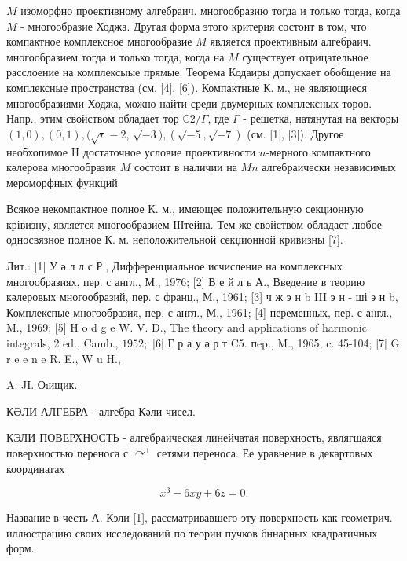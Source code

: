\documentclass[10pt]{article}
\begin{document}
$M$ изоморфно проективному алгебраич. многообразию тогда и только тогда, когда $M$ - многообразие Ходжа. Другая форма этого критерия состоит в том, что компактное комплексное многообразие $M$ является проективным алгебраич. многообразием тогда и только тогда, когда на $M$ существует отрицательное расслоение на комплексыые прямые. Теорема Кодаиры допускает обобщение на комплексные пространства (см. [4], [6]). Компактные К. м., не являющиеся многообразиями Ходжа, можно найти среди двумерных комплексных торов. Напр., этим свойством обладает тор $\mathbb{C} 2 / \Gamma$, где $\Gamma$ - решетка, натянутая на векторы $(1,0),(0,1),(\sqrt{r}-2$, $\sqrt{-3}),(\sqrt{-5}, \sqrt{-7})$ (см. [1], [3]). Другое необхопимое II достаточное условие проективности $n$-мерного компактного кәлерова многообразия $M$ состоит в наличии на $M n$ алгебраически независимых мероморфных функций



Всякое некомпактное полное К. м., имеющее положительную секционную крівизну, является многообразием ІІІтейна. Тем же свойством обладает любое односвязное полное К. м. неположительной секџионной кривизны [7].



Лит.: [1] У ә л л с Р., Дифференциальное исчисление на комплексных многообразиях, пер. с англ., М., 1976; [2] В е й л ь А., Введение в теорию кәлеровых многообразий, пер. с франц., М., 1961; [3] ч ж э н b III э н - ші э н b, Комплекспые многообразия, пер. с англ., М., 1961; [4] переменных, пер. с англ., M., 1969; [5] H o d g e W. V. D., The theory and applications of harmonic integrals, 2 ed., Camb., $1952 ;$ [6] Г р а у ә р т C5. пep., M., 1965, c. 45-104; [7] G r e e n e R. E., W u H.,



A. JI. Оıищик.



КӘЛИ АЛГЕБРА - алгебра Кәли чисел.



КЭЛИ ПОВЕРХНОСТЬ - алгебраическая линейчатая поверхность, являгщаяся поверхностью переноса с $\curvearrowright^{1}$ сетями переноса. Ее уравнение в декартовых координатах



\[

x^{3}-6 x y+6 z=0 .

\]



Название в честь А. Кэли [1], рассматривавшего эту поверхность как геометрич. иллюстрацию своих исследований по теории пучков бннарных квадратичных форм.
\end{document}
